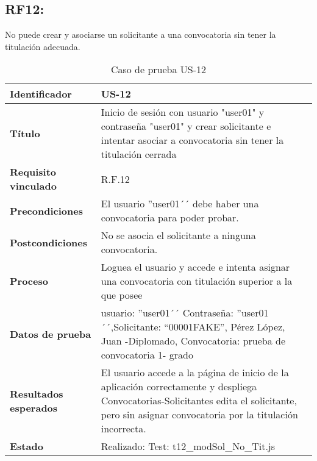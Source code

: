 \subsection{RF12:} No puede crear y asociarse un solicitante a una convocatoria sin tener la titulación adecuada.
\begin{table}[H]
	\centering
	\renewcommand{\arraystretch}{1.3} 
	\begin{tabularx}{\textwidth}{|l|X|}
		\hline
		\textbf{Identificador} & US-12 \\
		\hline
		\textbf{Título} & Inicio de sesión con usuario "user01" y contraseña "user01" y crear solicitante e intentar asociar a convocatoria sin tener la titulación cerrada\\
		\hline
		\textbf{Requisito vinculado} & R.F.12 \\
		\hline
		\textbf{Precondiciones} & El usuario ''user01´´ debe haber una convocatoria para poder probar.\\
		\hline
		\textbf{Postcondiciones} & No se asocia el solicitante a ninguna convocatoria. \\
		\hline
		\textbf{Proceso} & Loguea el usuario y accede e intenta asignar una convocatoria con titulación superior a la que posee\\
		\hline
		\textbf{Datos de prueba} & usuario: ''user01´´ Contraseña: ''user01´´,Solicitante: “00001FAKE”, Pérez López, Juan -Diplomado, Convocatoria: prueba de convocatoria 1- grado\\
		\hline
		\textbf{Resultados esperados} & El usuario accede a la página de inicio de la aplicación correctamente y despliega Convocatorias-Solicitantes edita el solicitante, pero sin asignar convocatoria por la titulación incorrecta. \\
		\hline
		\textbf{Estado} & Realizado: Test: t12\_modSol\_No\_Tit.js\\
		\hline
	\end{tabularx}
	\caption{Caso de prueba US-12}
	\label{tab:caso_uso12}
\end{table}

